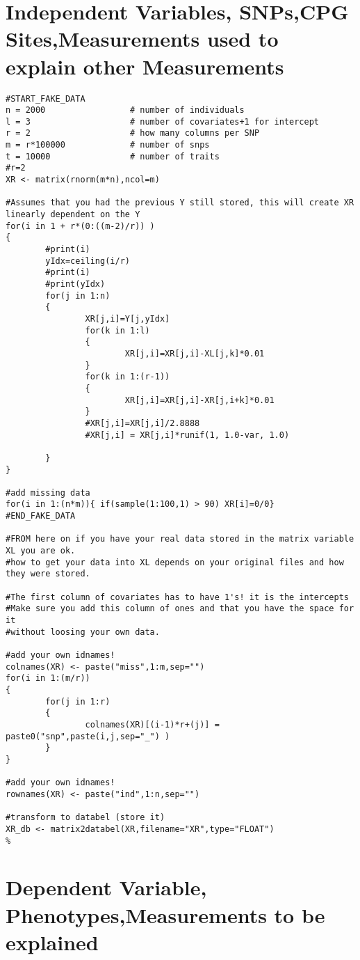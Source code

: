 \documentclass{report}
\begin{document}
\section{Independent Variables, SNPs,CPG Sites,Measurements used to explain other Measurements}
\begin{lstlisting}[escapechar=\%]
#START_FAKE_DATA
n = 2000                 # number of individuals
l = 3                    # number of covariates+1 for intercept
r = 2                    # how many columns per SNP
m = r*100000             # number of snps
t = 10000                # number of traits
#r=2
XR <- matrix(rnorm(m*n),ncol=m)

#Assumes that you had the previous Y still stored, this will create XR linearly dependent on the Y
for(i in 1 + r*(0:((m-2)/r)) )
{
        #print(i)
        yIdx=ceiling(i/r)
        #print(i)
        #print(yIdx)
        for(j in 1:n)
        {
                XR[j,i]=Y[j,yIdx]
                for(k in 1:l)
                {
                        XR[j,i]=XR[j,i]-XL[j,k]*0.01
                }
                for(k in 1:(r-1))
                {
                        XR[j,i]=XR[j,i]-XR[j,i+k]*0.01
                }
                #XR[j,i]=XR[j,i]/2.8888
                #XR[j,i] = XR[j,i]*runif(1, 1.0-var, 1.0)

        }
}

#add missing data
for(i in 1:(n*m)){ if(sample(1:100,1) > 90) XR[i]=0/0}
#END_FAKE_DATA

#FROM here on if you have your real data stored in the matrix variable XL you are ok.
#how to get your data into XL depends on your original files and how they were stored.

#The first column of covariates has to have 1's! it is the intercepts
#Make sure you add this column of ones and that you have the space for it
#without loosing your own data.

#add your own idnames!
colnames(XR) <- paste("miss",1:m,sep="")
for(i in 1:(m/r))
{
        for(j in 1:r)
        {
                colnames(XR)[(i-1)*r+(j)] = paste0("snp",paste(i,j,sep="_") )
        }
}

#add your own idnames!
rownames(XR) <- paste("ind",1:n,sep="")

#transform to databel (store it)
XR_db <- matrix2databel(XR,filename="XR",type="FLOAT")
%
\end{lstlisting}

\section{Dependent Variable, Phenotypes,Measurements to be explained}
\end{document}
